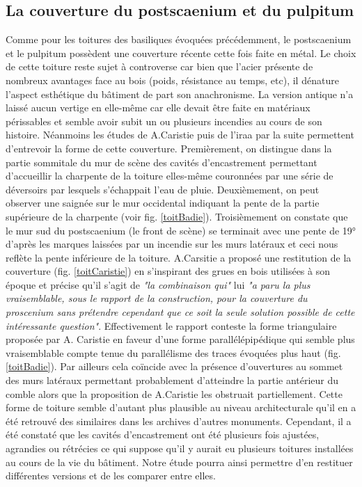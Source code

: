 		
		\subsection{La couverture du \gls{postscaenium} et du \gls{pulpitum}} \label{couverture}
		
		Comme pour les toitures des \glspl{basilique} évoquées précédemment, le \gls{postscaenium} et le \gls{pulpitum} possèdent une couverture récente cette fois faite en métal. Le choix de cette toiture reste sujet à controverse car bien que l'acier présente de nombreux avantages face au bois (poids, résistance au temps, etc), il dénature l'aspect esthétique du bâtiment de part son anachronisme. La version antique n'a laissé aucun vertige en elle-même car elle devait être faite en matériaux périssables et semble avoir subit un ou plusieurs incendies au cours de son histoire. Néanmoins les études de A.Caristie puis de l'\gls{iraa} par la suite permettent d'entrevoir la forme de cette couverture. Premièrement, on distingue dans la partie sommitale du mur de scène des cavités d'encastrement permettant d'accueillir la charpente de la toiture elles-même couronnées par une série de déversoirs par lesquels s’échappait l’eau de pluie. Deuxièmement, on peut observer une saignée sur le mur occidental indiquant la pente de la partie supérieure de la charpente (voir fig. \ref{toitBadie}). Troisièmement on constate que le mur sud du \gls{postscaenium} (le front de scène) se terminait avec une pente de 19° d'après les marques laissées par un incendie sur les murs latéraux et ceci nous reflète la pente inférieure de la toiture. A.Carsitie a proposé une restitution de la couverture (fig. \ref{toitCaristie}) en s'inspirant des grues en bois utilisées à son époque et précise qu'il s'agit de \textit{"la combinaison qui"} lui \textit{"a paru la plus vraisemblable, sous le rapport de la construction, pour la couverture du proscenium sans prétendre cependant que ce soit la seule solution possible de cette intéressante question"}. Effectivement le rapport \cite{orangeTxt} conteste la forme triangulaire proposée par A. Caristie en faveur d'une forme parallélépipédique qui semble plus vraisemblable compte tenue du parallélisme des traces évoquées plus haut (fig. \ref{toitBadie}). Par ailleurs cela coïncide avec la présence d'ouvertures au sommet des murs latéraux permettant probablement d'atteindre la partie antérieur du comble alors que la proposition de A.Caristie les obstruait partiellement. Cette forme de toiture semble d'autant plus plausible au niveau architecturale qu'il en a été retrouvé des similaires dans les archives d'autres monuments. Cependant, il a été constaté que les cavités d'encastrement ont été plusieurs fois ajustées, agrandies ou rétrécies ce qui suppose qu'il y aurait eu plusieurs toitures installées au cours de la vie du bâtiment. Notre étude pourra ainsi permettre d'en restituer différentes versions et de les comparer entre elles.
		
